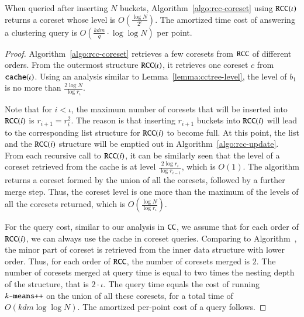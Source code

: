 \begin{lemma}
\label{lemma:rcc-level}
When queried after inserting $N$ buckets, 
Algorithm~\ref{algo:rcc-coreset} using $\texttt{RCC}(\iota)$ returns a coreset 
whose level is $O\left(\frac{\log N}{2^{\iota}}\right)$. 
The amortized time cost of answering a clustering query is 
$O\left(\frac{kdm}{q} \cdot \log \log N \right)$ per point. 
\end{lemma}
\begin{proof}
Algorithm~\ref{algo:rcc-coreset} retrieves a few coresets from $\texttt{RCC}$ of different orders. 
From the outermost structure $\texttt{RCC}(\iota)$, 
it retrieves one coreset $c$ from $\texttt{cache}(\iota)$. 
Using an analysis similar to Lemma~\ref{lemma:cctree-level}, 
the level of $b_{1}$ is no more than $\frac{2 \log N}{\log r_{\iota}}$. 

Note that for $i < \iota$, the maximum number of coresets that will be inserted
into $\texttt{RCC}(i)$ is $r_{i+1} = r_i^2$. The reason is that inserting $r_{i+1}$
buckets into $\texttt{RCC}(i)$ will lead to the corresponding list structure for
$\texttt{RCC}(i)$ to become full. At this point, the list and the $\texttt{RCC}(i)$ structure
will be emptied out in Algorithm~\ref{algo:rcc-update}. From each recursive call
to $\texttt{RCC}(i)$, it can be similarly seen that the level of a coreset retrieved
from the cache is at level $\frac{2 \log{r_i}}{\log r_{i-1}}$, which is
$O(1)$. The algorithm returns a coreset formed by the union of all the coresets,
followed by a further merge step. Thus, the coreset level is one more than the
maximum of the levels of all the coresets returned, which is
$O\left( \frac{\log N}{\log r_{\iota}} \right)$.

For the query cost, similar to our analysis in $\texttt{CC}$, we assume that 
for each order of $\texttt{RCC}(i)$, we can always use the cache in coreset queries.
Comparing to Algorithm~\cccoreset, the minor part of coreset is retrieved from the inner 
\rcc data structure with lower order. Thus, for each order of $\texttt{RCC}$, the number 
of coresets merged is $2$. The number of coresets merged at query time 
is equal to two times the nesting depth of the structure, that is $2 \cdot \iota$. 
The query time equals the cost of running $\texttt{$k$-means++}$ on the union of all these coresets, 
for a total time of $O(kd m \log \log N)$. The amortized per-point cost of a query follows.

\end{proof}


